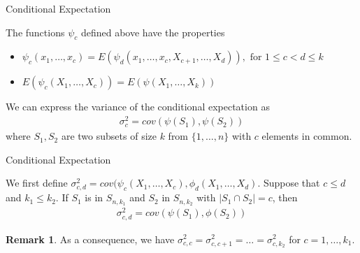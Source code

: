 \documentclass{beamer}
\theoremstyle{definition}
\numberwithin{Def}{section}
\newtheorem{Rmk}{Remark}
\begin{document}
\begin{frame}{Conditional Expectation}
\begin{theorem}\label{cond_exp}
The functions $\psi_c$ defined above have the properties
        \begin{itemize}
            \item $\psi_c(x_1, \dotsc, x_c) = E(\psi_d(x_1, \dotsc, x_c, X_{c+1}, \dotsc, X_d)), \text{ for } 1 \leq c <d \leq k$
            \item $E(\psi_c(X_1, \dotsc, X_c)) = E(\psi(X_1, \dotsc, X_k))$
        \end{itemize}
\end{theorem}

\pause
\begin{theorem}\label{cond_exp_prop}
We can express the variance of the conditional expectation as \begin{align}
    \sigma_c^2 = cov(\psi(S_1), \psi(S_2))
\end{align}
where $S_1, S_2$ are two subsets of size $k$ from $\{1, \dotsc, n\}$ with $c$ elements in common. 
\end{theorem}
\end{frame}

\begin{frame}{Conditional Expectation}
\begin{theorem}
We first define $\sigma_{c,d}^2 = cov(\psi_c(X_1, \dotsc, X_c), \phi_d(X_1, \dotsc, X_d)$. Suppose that $c \leq d$ and $k_1 \leq k_2$. If $S_1$ is in $S_{n,k_1}$ and $S_2$ in $S_{n, k_2}$ with $|S_1 \cap S_2| = c$, then 
    \begin{align}
    \sigma_{c,d}^2 = cov(\psi(S_1), \phi(S_2))
    \end{align}
\end{theorem}
\pause 
\begin{Rmk}
 As a consequence, we have $\sigma_{c,c}^2 = \sigma_{c,c+1}^2 = \dotsc = \sigma_{c,k_2}^2$ for $c = 1, \dotsc, k_1$.    
\end{Rmk}
\end{frame}
\end{document}

